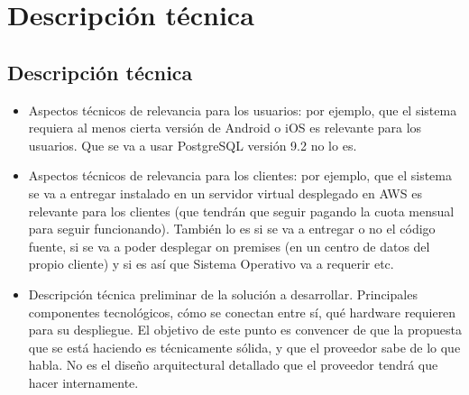 
\chapter{Descripci\'on t\'ecnica} %

\label{Chapter3} %


\section{Descripci\'on t\'ecnica}

\begin{itemize}
	\item Aspectos técnicos de relevancia para los usuarios: por ejemplo, que el sistema requiera al menos cierta versión de Android o iOS es relevante para los usuarios. Que se va a usar PostgreSQL versión 9.2 no lo es.

	\item Aspectos técnicos de relevancia para los clientes: por ejemplo, que el sistema se va a entregar instalado en un servidor virtual desplegado en AWS es relevante para los clientes (que tendrán que seguir pagando la cuota mensual para seguir funcionando). También lo es si se va a entregar o no el código fuente, si se va a poder desplegar on premises (en un centro de datos del propio cliente) y si es así que Sistema Operativo va a requerir etc.
	
	\item Descripción técnica preliminar de la solución a desarrollar. Principales componentes tecnológicos, cómo se conectan entre sí, qué hardware requieren para su despliegue. El objetivo de este punto es convencer de que la propuesta que se está haciendo es técnicamente sólida, y que el proveedor sabe de lo que habla. No es el diseño arquitectural detallado que el proveedor tendrá que hacer internamente.
\end{itemize}
